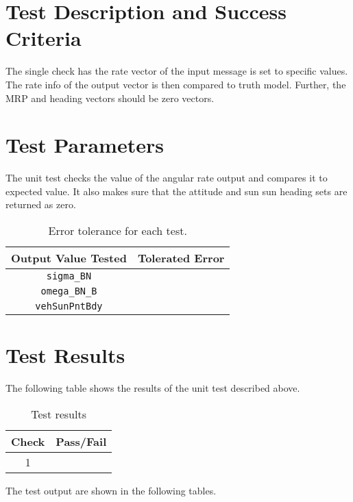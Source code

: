 
\section{Test Description and Success Criteria}
The single check has the rate vector of the input message is set to specific values.  The rate info of the output vector is then compared to truth model.  Further, the MRP and heading vectors should be zero vectors.




\section{Test Parameters}
The unit test checks the value of the angular rate output and compares it to expected value.  It also makes sure that the attitude and sun sun heading sets are returned as zero.

\begin{table}[htbp]
	\caption{Error tolerance for each test.}
	\label{tab:errortol}
	\centering \fontsize{10}{10}\selectfont
	\begin{tabular}{ c | c } %
		\hline\hline
		\textbf{Output Value Tested}  & \textbf{Tolerated Error}  \\ 
		\hline
		{\tt sigma\_BN}        & 	   \\ 
		{\tt omega\_BN\_B}        & 	   \\ 
		{\tt vehSunPntBdy}        & 	   \\ 
		\hline\hline
	\end{tabular}
\end{table}




\section{Test Results}
The following table shows the results of the unit test described above.

\begin{table}[H]
	\caption{Test results}
	\label{tab:results}
	\centering \fontsize{10}{10}\selectfont
	\begin{tabular}{c | c  } %
		\hline\hline
		\textbf{Check} 						  		&\textbf{Pass/Fail} \\ 
		\hline
	   1	   			&  \\ 
	   \hline\hline
	\end{tabular}
\end{table}



The test output are shown in the following tables.








